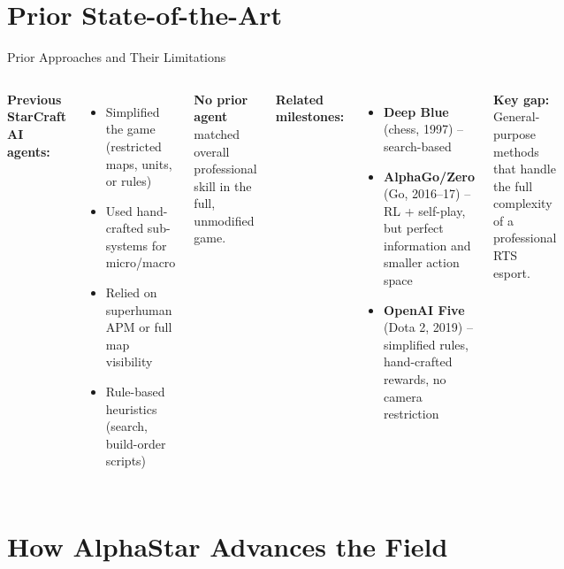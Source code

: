 \documentclass[aspectratio=169]{beamer}
\begin{document}
\section{Prior State-of-the-Art}

\begin{frame}{Prior Approaches and Their Limitations}
\begin{columns}[T]
\textbf{Previous StarCraft AI agents:}
\begin{itemize}
    \item Simplified the game (restricted maps, units, or rules)
    \item Used hand-crafted sub-systems for micro/macro
    \item Relied on superhuman APM or full map visibility
    \item Rule-based heuristics (search, build-order scripts)
\end{itemize}

\vspace{0.5em}
\textbf{No prior agent} matched overall professional skill in the full, unmodified game.

\textbf{Related milestones:}
\begin{itemize}
    \item \textbf{Deep Blue} (chess, 1997) -- search-based
    \item \textbf{AlphaGo/Zero} (Go, 2016--17) -- RL + self-play, but perfect information and smaller action space
    \item \textbf{OpenAI Five} (Dota 2, 2019) -- simplified rules, hand-crafted rewards, no camera restriction
\end{itemize}

\vspace{0.5em}
\textbf{Key gap:} General-purpose methods that handle the full complexity of a professional RTS esport.
\end{columns}
\end{frame}

\section{How AlphaStar Advances the Field}
\end{document}
